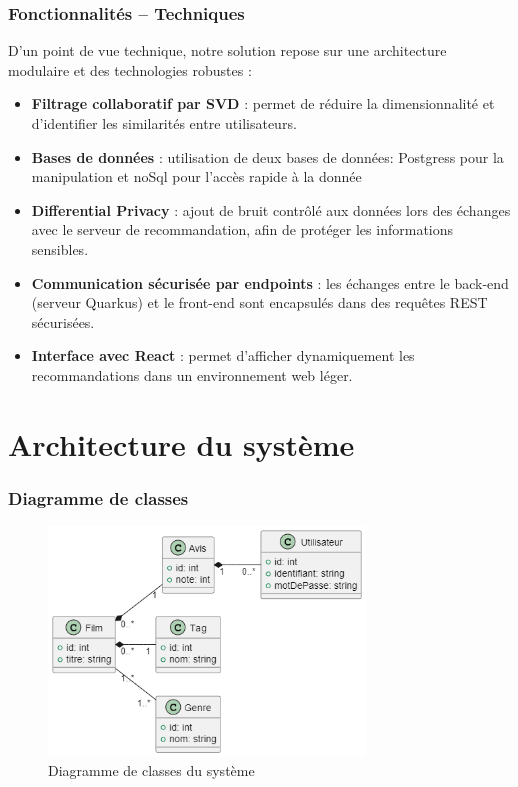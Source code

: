 \documentclass{beamer}
\begin{document}
    \begin{frame}
        \frametitle{Fonctionnalités – Techniques}
        \small
        D’un point de vue technique, notre solution repose sur une architecture modulaire et des technologies robustes :

        \begin{itemize}
            \item \textbf{Filtrage collaboratif par SVD} : permet de réduire la dimensionnalité et d’identifier les similarités entre utilisateurs.
            \item \textbf{Bases de données} : utilisation de deux bases de données: Postgress pour la manipulation et noSql pour l'accès rapide à la donnée
            \item \textbf{Differential Privacy} : ajout de bruit contrôlé aux données lors des échanges avec le serveur de recommandation, afin de protéger les informations sensibles.
            \item \textbf{Communication sécurisée par endpoints} : les échanges entre le back-end (serveur Quarkus) et le front-end sont encapsulés dans des requêtes REST sécurisées.
            \item \textbf{Interface avec React} : permet d’afficher dynamiquement les recommandations dans un environnement web léger.
        \end{itemize}

    \end{frame}



    \section{Architecture du système}
    \begin{frame}
        \frametitle{Diagramme de classes}
        \vspace{0.5cm}
        \begin{figure}
            \centering
            \includegraphics[width=0.75\textwidth]{classe.png}
            \caption{\small Diagramme de classes du système}
        \end{figure}
    \end{frame}
\end{document}
